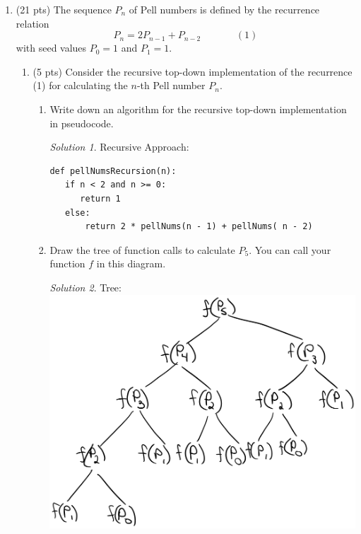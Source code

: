 \documentclass[12pt]{article}
\theoremstyle{remark}
\newtheorem*{solution}{Solution}
\begin{document}
\begin{enumerate}
    
    \item (21 pts) The sequence $P_n$ of Pell numbers is defined by the recurrence relation
	 $$P_n=2P_{n-1}+P_{n-2}~~~~~~~~~~~~~~~~(1)$$ 
	 with seed values $P_0=1$ and $P_1=1$. 
	
	\begin{enumerate}
	\item \label{q:3:memfia}   (5 pts)   Consider the recursive top-down implementation of the recurrence (1) for calculating the $n$-th Pell number $P_n$.  
	\begin{enumerate}
	\item Write down an algorithm for the recursive top-down implementation in pseudocode. \\
	\begin{solution} Recursive Approach: \\
\begin{verbatim}
def pellNumsRecursion(n):
   if n < 2 and n >= 0:
      return 1
   else:
       return 2 * pellNums(n - 1) + pellNums( n - 2)
\end{verbatim}
    \end{solution}
	
    \item Draw the tree of function calls to calculate $P_5$. You can call your function $f$ in this diagram.\\
	\begin{solution}Tree: \\
\includegraphics[scale=0.5]{PS9b-Q1a.png} 
    \end{solution}
\pagebreak
	

\end{enumerate}
\end{enumerate}
\end{enumerate}
\end{document}
